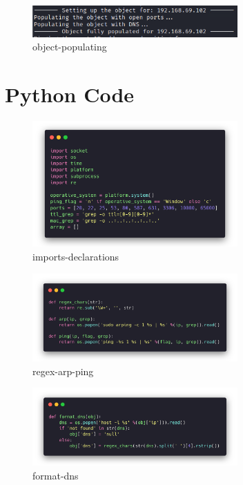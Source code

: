 \begin{figure}[H]
  \centering
  \includegraphics[width=0.7\textwidth]{figures/object-populating}
  \caption{object-populating}
  \label{f:object-populating}
\end{figure}

\section{Python Code}
\label{s:lab2-python-code}

\begin{figure}[H]
  \centering
  \includegraphics[width=0.7\textwidth]{figures/code/imports}
  \caption{imports-declarations}
  \label{f:imports-declarations}
\end{figure}

\begin{figure}[H]
  \centering
  \includegraphics[width=0.7\textwidth]{figures/code/regex-arp-ping}
  \caption{regex-arp-ping}
  \label{f:regex-arp-ping}
\end{figure}

\begin{figure}[H]
  \centering
  \includegraphics[width=0.7\textwidth]{figures/code/format-dns}
  \caption{format-dns}
  \label{f:format-dns}
\end{figure}

